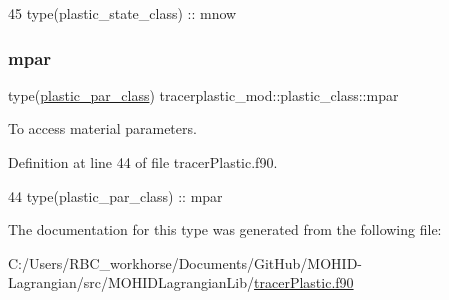 \begin{DoxyCode}
45         \textcolor{keywordtype}{type}(plastic\_state\_class) :: mnow
\end{DoxyCode}
\mbox{\label{structtracerplastic__mod_1_1plastic__class_aa7e8b3a74a085714eac5917aaa2fc8c6}} 
\subsubsection{\texorpdfstring{mpar}{mpar}}
{\footnotesize\ttfamily type(\mbox{\hyperlink{structtracerplastic__mod_1_1plastic__par__class}{plastic\+\_\+par\+\_\+class}}) tracerplastic\+\_\+mod\+::plastic\+\_\+class\+::mpar\hspace{0.3cm}{\ttfamily [private]}}



To access material parameters. 



Definition at line 44 of file tracer\+Plastic.\+f90.


\begin{DoxyCode}
44         \textcolor{keywordtype}{type}(plastic\_par\_class)   :: mpar
\end{DoxyCode}


The documentation for this type was generated from the following file\+:\begin{DoxyCompactItemize}
\item 
C\+:/\+Users/\+R\+B\+C\+\_\+workhorse/\+Documents/\+Git\+Hub/\+M\+O\+H\+I\+D-\/\+Lagrangian/src/\+M\+O\+H\+I\+D\+Lagrangian\+Lib/\mbox{\hyperlink{tracer_plastic_8f90}{tracer\+Plastic.\+f90}}\end{DoxyCompactItemize}
